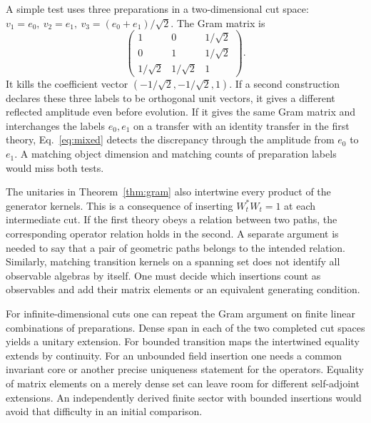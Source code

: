 \documentclass[11pt,letterpaper]{article}
\begin{document}
A simple test uses three preparations in a two-dimensional cut space:
\(v_1=e_0,\ v_2=e_1,\ v_3=(e_0+e_1)/\sqrt2\). The Gram matrix is
\[
 \begin{pmatrix}
  1&0&1/\sqrt2\\
  0&1&1/\sqrt2\\
  1/\sqrt2&1/\sqrt2&1
 \end{pmatrix}.
\]
It kills the coefficient vector \((-1/\sqrt2,-1/\sqrt2,1)\).
If a second construction declares these three labels to be orthogonal
unit vectors, it gives a different reflected amplitude even before
evolution. If it gives the same Gram matrix and interchanges the labels
\(e_0,e_1\) on a transfer with an identity transfer in the first theory,
Eq.~\eqref{eq:mixed} detects the discrepancy through the amplitude from
\(e_0\) to \(e_1\). A matching object dimension and matching counts of
preparation labels would miss both tests.

The unitaries in Theorem~\ref{thm:gram} also intertwine every product of
the generator kernels. This is a consequence of inserting \(W_t^*W_t=1\)
at each intermediate cut. If the first theory obeys a relation between
two paths, the corresponding operator relation holds in the second.
A separate argument is needed to say that a pair of geometric paths
belongs to the intended relation. Similarly, matching transition kernels
on a spanning set does not identify all observable algebras by itself.
One must decide which insertions count as observables and add their
matrix elements or an equivalent generating condition.

For infinite-dimensional cuts one can repeat the Gram argument on
finite linear combinations of preparations. Dense span in each of the
two completed cut spaces yields a unitary extension. For bounded
transition maps the intertwined equality extends by continuity. For an
unbounded field insertion one needs a common invariant core or another
precise uniqueness statement for the operators. Equality of matrix
elements on a merely dense set can leave room for different
self-adjoint extensions. An independently derived finite sector with
bounded insertions would avoid that difficulty in an initial comparison.
\end{document}
